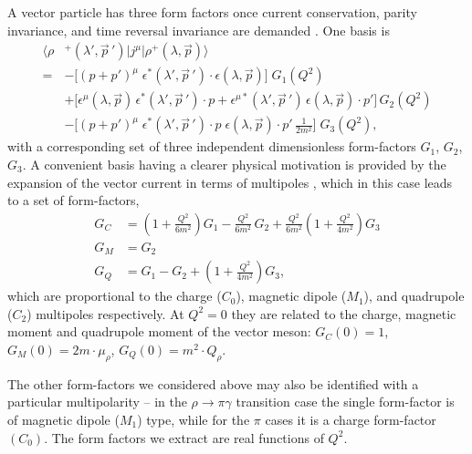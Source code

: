 A vector particle has three form factors once current conservation, parity invariance, and time reversal invariance are demanded  \cite{Arnold:1979cg}. One basis is 
\begin{align}
\big\langle \rho&^+(\lambda',\vec{p}\,') \big| j^\mu \big| \rho^+(\lambda, \vec{p}) \big\rangle \nonumber \\
= 	&- \big[(p+p')^\mu \; \epsilon^*(\lambda',\vec{p}\,') \cdot \epsilon(\lambda,\vec{p}) \big]\; G_1(Q^2) \nonumber \\
	&+ \big[\epsilon^\mu(\lambda,\vec{p}) \, \epsilon^*(\lambda',\vec{p}\,') \!\cdot\! p + \epsilon^{\mu*}(\lambda',\vec{p}\,')\, \epsilon(\lambda,\vec{p})\!\cdot\! p' \big]\, G_2(Q^2) \nonumber \\
	&- \big[(p+p')^\mu \; \epsilon^*(\lambda',\vec{p}\,') \!\cdot\! p \;  \epsilon(\lambda,\vec{p})\!\cdot\! p' \, \tfrac{1}{2m^2} \big]\; G_3(Q^2), \label{eqn::rho_Gi_basis}
\end{align} 
with a corresponding set of three independent dimensionless form-factors $G_1$, $G_2$, $G_3$. A convenient basis having a clearer physical motivation is provided by the expansion of the vector current in terms of multipoles \cite{Durand:1962zza}, which in this case leads to a set of form-factors,
\begin{align}
G_C &= \left(1 + \tfrac{Q^2}{6m^2} \right) G_1 - \tfrac{Q^2}{6m^2} \, G_2 + \tfrac{Q^2}{6m^2} \left(1 + \tfrac{Q^2}{4m^2} \right) G_3 \nonumber \\
G_M &= G_2 \nonumber \\
G_Q &= G_1 - G_2 + \left(1 + \tfrac{Q^2}{4m^2} \right) G_3, \label{eqn::rho_Gmultipole_basis}
\end{align}
which are proportional to the charge ($C_0$), magnetic dipole ($M_1$), and quadrupole ($C_2$) multipoles respectively. At $Q^2=0$ they are related to the charge, magnetic moment and quadrupole moment of the vector meson: $G_C(0) = 1$, $G_M(0) = 2 m\cdot  \mu_\rho$, $G_Q(0) = m^2 \cdot Q_\rho$.

The other form-factors we considered above may also be identified with a particular multipolarity -- in the ${\rho \to \pi \gamma}$ transition case the single form-factor is of magnetic dipole ($M_1$) type, while for the $\pi$ cases it is a charge form-factor  $(C_0)$. The form factors we extract are real functions of $Q^2$. 


